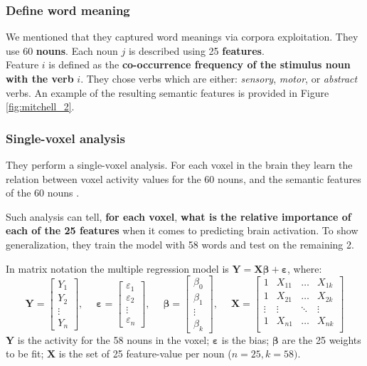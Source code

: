 \subsubsection{Define word meaning}
We mentioned that they captured word meanings via corpora exploitation. They use 60 \textbf{nouns}. Each noun $j$ is described using 25 \textbf{features}.\\
Feature $i$ is defined as the \textbf{co-occurrence frequency of the stimulus noun with the verb} $i$. They chose verbs which are either: \textit{sensory}, \textit{motor}, or \textit{abstract} verbs. An example of the resulting semantic features is provided in Figure \ref{fig:mitchell_2}.

\subsubsection{Single-voxel analysis}
They perform a single-voxel analysis. For each voxel in the brain they learn the relation between voxel activity values for the 60 nouns, and the semantic features of the 60 nouns \notet.

Such analysis can tell, \textbf{for each voxel},\textbf{ what is the relative importance of each of the 25 features} when it comes to predicting brain activation. To show generalization, they train the model with 58 words and test on the remaining 2.

In matrix notation the multiple regression model is $\mathbf{Y=X}\boldsymbol{\beta}+\boldsymbol{\varepsilon}$, where:
\[ 
     \mathbf{Y} = \begin{bmatrix}
     Y_1 \\ Y_2 \\ \vdots \\ Y_n
     \end{bmatrix}, \quad\; 
     \boldsymbol{\varepsilon} = \begin{bmatrix}
     \varepsilon_1 \\ \varepsilon_2 \\ \vdots \\ \varepsilon_n
     \end{bmatrix}, \quad\;
     \boldsymbol{\beta} = \begin{bmatrix}
     \beta_0 \\ \beta_1 \\ \vdots \\ \beta_k
     \end{bmatrix}, \quad\;
     \mathbf{X} = \begin{bmatrix}
     1 & X_{11} & \dots & X_{1k}\\
     1 & X_{21} & \dots & X_{2k}\\
     \vdots & \vdots & \ddots & \vdots\\
     1 & X_{n1} & \dots & X_{nk}\\
     \end{bmatrix}
\] 
$\mathbf{Y}$ is the activity for the 58 nouns in the voxel; $\boldsymbol{\varepsilon}$ is the bias; $\boldsymbol{\beta}$ are the 25 weights to be fit; $\mathbf{X}$ is the set of 25 feature-value per noun ($n=25, k=58)$.

